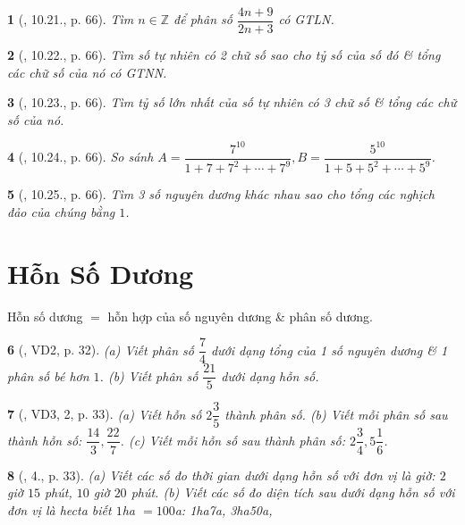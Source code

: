 \documentclass{article}
\newtheorem{baitoan}{}
\begin{document}
\begin{baitoan}[\cite{TLCT_THCS_Toan_6_so_hoc}, 10.21., p. 66]
	Tìm $n\in\mathbb{Z}$ để phân số $\dfrac{4n + 9}{2n + 3}$ có {\rm GTLN}.
\end{baitoan}

\begin{baitoan}[\cite{TLCT_THCS_Toan_6_so_hoc}, 10.22., p. 66]
	Tìm số tự nhiên có 2 chữ số sao cho tỷ số của số đó \& tổng các chữ số của nó có {\rm GTNN}.
\end{baitoan}

\begin{baitoan}[\cite{TLCT_THCS_Toan_6_so_hoc}, 10.23., p. 66]
	Tìm tỷ số lớn nhất của số tự nhiên có 3 chữ số \& tổng các chữ số của nó.
\end{baitoan}

\begin{baitoan}[\cite{TLCT_THCS_Toan_6_so_hoc}, 10.24., p. 66]
	So sánh $A = \dfrac{7^{10}}{1 + 7 + 7^2 + \cdots + 7^9},B = \dfrac{5^{10}}{1 + 5 + 5^2 + \cdots + 5^9}$.
\end{baitoan}

\begin{baitoan}[\cite{TLCT_THCS_Toan_6_so_hoc}, 10.25., p. 66]
	Tìm 3 số nguyên dương khác nhau sao cho tổng các nghịch đảo của chúng bằng $1$.
\end{baitoan}


\section{Hỗn Số Dương}
Hỗn số dương $=$ hỗn hợp của số nguyên dương \& phân số dương.

\begin{baitoan}[\cite{Binh_Toan_6_tap_2}, VD2, p. 32]
	(a) Viết phân số $\dfrac{7}{4}$ dưới dạng tổng của 1 số nguyên dương \& 1 phân số bé hơn $1$. (b) Viết phân số $\dfrac{21}{5}$ dưới dạng hỗn số.
\end{baitoan}

\begin{baitoan}[\cite{Binh_Toan_6_tap_2}, VD3, 2, p. 33]
	(a) Viết hỗn số $2\dfrac{3}{5}$ thành phân số. (b) Viết mỗi phân số sau thành hỗn số: $\dfrac{14}{3},\dfrac{22}{7}$. (c) Viết mỗi hỗn số sau thành phân số: $2\dfrac{3}{4},5\dfrac{1}{6}$.
\end{baitoan}

\begin{baitoan}[\cite{SGK_Toan_6_Canh_Dieu_tap_2}, 4., p. 33]
	(a) Viết các số đo thời gian dưới dạng hỗn số với đơn vị là giờ: $2$ giờ $15$ phút, $10$ giờ $20$ phút. (b) Viết các số đo diện tích sau dưới dạng hỗn số với đơn vị là hecta biết $1$\emph{ha} $= 100$\emph{a}: \emph{1ha7a, 3ha50a},
\end{baitoan}
\end{document}
